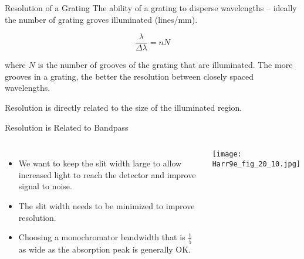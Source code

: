 \documentclass[handout]{beamer}
\begin{document}
\begin{frame}{Resolution of a Grating}
	The ability of a grating to disperse wavelengths -- ideally the number
	of grating groves illuminated (lines/\si{\milli\meter}).

	\begin{equation*}
		\frac{\lambda}{\Delta \lambda} = n N
	\end{equation*}

	where $N$ is the number of grooves of the grating that are illuminated.
	The more grooves in a grating, the better the resolution between closely
	spaced wavelengths.
	
	\alert{Resolution is directly related to the size of
	the illuminated region.}
\end{frame}

\begin{frame}{Resolution is Related to Bandpass}
	\begin{columns}
		\begin{itemize}
			\item We want to keep the slit width large to allow
				increased light to reach the detector and
				improve \alert{signal to noise}.
			\item The slit width needs to be minimized to improve
				resolution.
			\item Choosing a monochromator bandwidth that is
				$\frac{1}{5}$ as wide as the absorption peak is
				generally OK.
		\end{itemize}
	\begin{center}
		\texttt{[image: Harr9e\_fig\_20\_10.jpg]}
	\end{center}
	\end{columns}
\end{frame}
\end{document}
